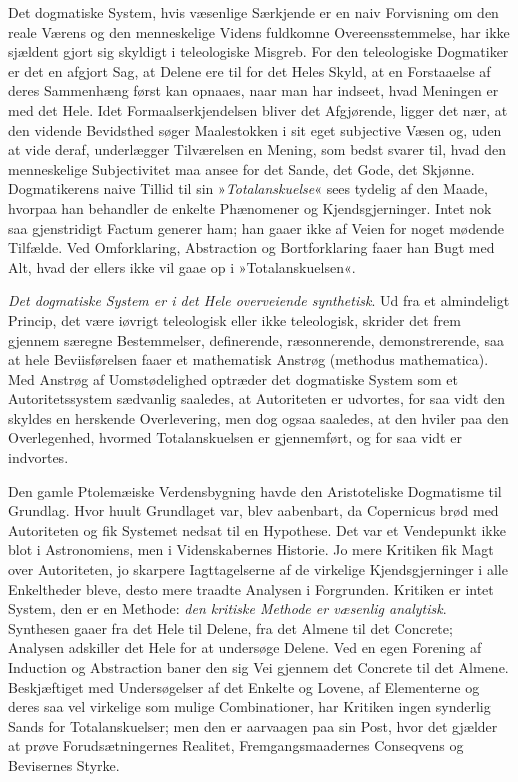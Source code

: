 \documentclass[12pt]{book}
\newcommand{\apage}[1]{\marginnote{\footnotesize\textit{[#1]}}}
\begin{document}
Det dogmatiske System, hvis væsenlige Særkjende er en naiv Forvisning om
den reale Værens og den menneskelige Videns fuldkomne Overeensstemmelse,
har ikke sjældent gjort sig skyldigt i teleologiske Misgreb. \apage{75} For den
teleologiske Dogmatiker er det en afgjort Sag, at Delene ere til for det
Heles Skyld, at en Forstaaelse af deres Sammenhæng først kan opnaaes, naar
man har indseet, hvad Meningen er med det Hele. Idet Formaalserkjendelsen
bliver det Afgjørende, ligger det nær, at den vidende Bevidsthed søger
Maalestokken i sit eget subjective Væsen og, uden at vide deraf,
underlægger Tilværelsen en Mening, som bedst svarer til, hvad den
menneskelige Subjectivitet maa ansee for det Sande, det Gode, det Skjønne.
Dogmatikerens naive Tillid til sin »\emph{Totalanskuelse}« sees tydelig af den
Maade, hvorpaa han behandler de enkelte Phænomener og Kjendsgjerninger.
Intet nok saa gjenstridigt Factum generer ham; han gaaer ikke af Veien for
noget mødende Tilfælde. Ved Omforklaring, Abstraction og Bortforklaring
faaer han Bugt med Alt, hvad der ellers ikke vil gaae op i
»Totalanskuelsen«.

\emph{Det dogmatiske System er i det Hele overveiende synthetisk}. Ud fra et
almindeligt Princip, det være iøvrigt teleologisk eller ikke teleologisk,
skrider det frem gjennem særegne Bestemmelser, definerende, ræsonnerende,
demonstrerende, saa at hele Beviisførelsen faaer et mathematisk Anstrøg
(methodus mathematica). Med Anstrøg af Uomstødelighed optræder det
dogmatiske System som et Autoritetssystem sædvanlig saaledes, at
Autoriteten er udvortes, for saa vidt den skyldes en herskende Overlevering,
men dog ogsaa saaledes, at den hviler paa den Overlegenhed, hvormed
Totalanskuelsen er gjennemført, og for saa vidt er indvortes.

\apage{76} Den gamle Ptolemæiske Verdensbygning havde den Aristoteliske Dogmatisme
til Grundlag. Hvor huult Grundlaget var, blev aabenbart, da Copernicus
brød med Autoriteten og fik Systemet nedsat til en Hypothese. Det var et
Vendepunkt ikke blot i Astronomiens, men i Videnskabernes Historie. Jo mere
Kritiken fik Magt over Autoriteten, jo skarpere Iagttagelserne af de
virkelige Kjendsgjerninger i alle Enkeltheder bleve, desto mere traadte
Analysen i Forgrunden. Kritiken er intet System, den er en Methode:
\emph{den
kritiske Methode er væsenlig analytisk}. Synthesen gaaer fra det Hele til
Delene, fra det Almene til det Concrete; Analysen adskiller det Hele for at
undersøge Delene. Ved en egen Forening af Induction og Abstraction baner
den sig Vei gjennem det Concrete til det Almene. Beskjæftiget med
Undersøgelser af det Enkelte og Lovene, af Elementerne og deres saa vel
virkelige som mulige Combinationer, har Kritiken ingen synderlig Sands for
Totalanskuelser; men den er aarvaagen paa sin Post, hvor det gjælder at
prøve Forudsætningernes Realitet, Fremgangsmaadernes Conseqvens og
Bevisernes Styrke.
\end{document}
